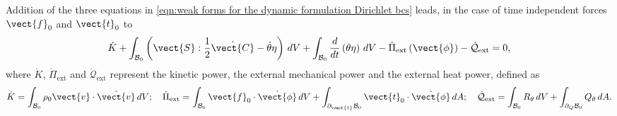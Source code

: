 %

Addition of the three equations in \eqref{eqn:weak forms for the dynamic formulation Dirichlet bcs} leads, in the case of time independent forces $\vect{f}_0$ and $\vect{t}_0$ to
%
\begin{equation}\label{eqn:Wvarphi conservation of energy}
\begin{aligned}
\dot{K} + \int_{\mathcal{B}_0}\left(\vect{S}:\frac{1}{2}\dot{\vect{C}}
%
- \dot{\theta}\eta\right)\,dV + \int_{\mathcal{B}_0}\frac{d}{dt}\left(\theta\eta\right)\,dV -\dot{\Pi}_{\text{ext}}\left(\vect{\phi}\right)  - \dot{\mathcal{Q}}_{\text{ext}} = 0,
%
\end{aligned}
\end{equation}
%
where $\dot{K}$, $\dot{\Pi}_{\text{ext}}$ and $\dot{\mathcal{Q}}_{\text{ext}}$ represent the kinetic power, the external mechanical power and the external heat power, defined as
%
{\begin{equation}
\dot{K}=\int_{\mathcal{B}_0}\rho_0\vect{v}\cdot\dot{\vect{v}}\,dV;\quad
%
\dot{\Pi}_{\text{ext}} = \int_{\mathcal{B}_0}\vect{f}_0\cdot\dot{\vect{\phi}}\,dV+\int_{\partial_{\vect{t}}\mathcal{B}_0}\vect{t}_0\cdot\dot{\vect{\phi}}\,dA;\quad
%
\dot{\mathcal{Q}}_{\text{ext}} = \int_{\mathcal{B}_0}R_{\theta}\,dV + \int_{\partial_Q\mathcal{B}_0}Q_{\theta}\,dA.
\end{equation}} 

